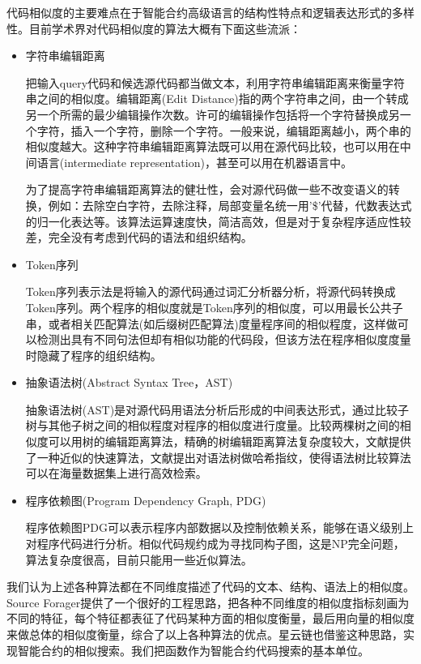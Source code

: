 代码相似度的主要难点在于智能合约高级语言的结构性特点和逻辑表达形式的多样性。目前学术界对代码相似度的算法大概有下面这些流派：
\begin{itemize}
	\item 字符串编辑距离

把输入query代码和候选源代码都当做文本，利用字符串编辑距离来衡量字符串之间的相似度。编辑距离(Edit Distance)指的两个字符串之间，由一个转成另一个所需的最少编辑操作次数。许可的编辑操作包括将一个字符替换成另一个字符，插入一个字符，删除一个字符。一般来说，编辑距离越小，两个串的相似度越大。这种字符串编辑距离算法既可以用在源代码比较，也可以用在中间语言(intermediate representation)，甚至可以用在机器语言中。

为了提高字符串编辑距离算法的健壮性，会对源代码做一些不改变语义的转换，例如：去除空白字符，去除注释，局部变量名统一用'\$'代替，代数表达式的归一化表达等。该算法运算速度快，简洁高效，但是对于复杂程序适应性较差，完全没有考虑到代码的语法和组织结构。

	\item Token序列

Token序列表示法是将输入的源代码通过词汇分析器分析，将源代码转换成Token序列。两个程序的相似度就是Token序列的相似度，可以用最长公共子串，或者相关匹配算法(如后缀树匹配算法)度量程序间的相似程度，这样做可以检测出具有不同句法但却有相似功能的代码段，但该方法在程序相似度度量时隐藏了程序的组织结构。

	\item 抽象语法树(Abstract Syntax Tree，AST)
	
抽象语法树(AST)是对源代码用语法分析后形成的中间表达形式，通过比较子树与其他子树之间的相似程度对程序的相似度进行度量。比较两棵树之间的相似度可以用树的编辑距离算法\cite{zhang1989simple}，精确的树编辑距离算法复杂度较大，文献\cite{guha2002approximate}提供了一种近似的快速算法，文献\cite{chilowicz2009syntax}提出对语法树做哈希指纹，使得语法树比较算法可以在海量数据集上进行高效检索。

	\item 程序依赖图(Program Dependency Graph, PDG)

程序依赖图PDG\cite{ferrante1987program}可以表示程序内部数据以及控制依赖关系，能够在语义级别上对程序代码进行分析。相似代码规约成为寻找同构子图，这是NP完全问题，算法复杂度很高，目前只能用一些近似算法。

\end{itemize}

我们认为上述各种算法都在不同维度描述了代码的文本、结构、语法上的相似度。Source Forager\cite{kashyap2017source}提供了一个很好的工程思路，把各种不同维度的相似度指标刻画为不同的特征，每个特征都表征了代码某种方面的相似度衡量，最后用向量的相似度来做总体的相似度衡量，综合了以上各种算法的优点。星云链也借鉴这种思路，实现智能合约的相似搜索。我们把函数作为智能合约代码搜索的基本单位。

